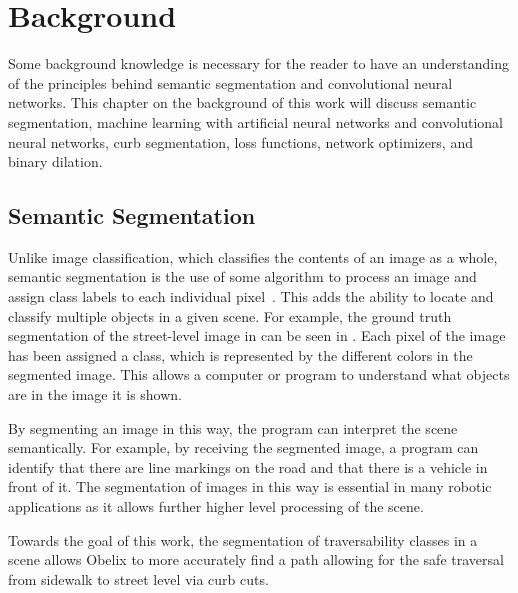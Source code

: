 \chapter{Background}\label{chap:background}
Some background knowledge is necessary for the reader to have an understanding of the principles behind semantic segmentation and convolutional neural networks.
This chapter on the background of this work will discuss semantic segmentation, machine learning with artificial neural networks and convolutional neural networks, curb segmentation, loss functions, network optimizers, and binary dilation.

\section{Semantic Segmentation}\label{section:background-segmentation}
Unlike image classification, which classifies the contents of an image as a whole, semantic segmentation is the use of some algorithm to process an image and assign class labels to each individual pixel~\cite{segmentation-medium}.
This adds the ability to locate and classify multiple objects in a given scene.
For example, the ground truth segmentation of the street-level image in  can be seen in .
Each pixel of the image has been assigned a class, which is represented by the different colors in the segmented image.
This allows a computer or program to understand what objects are in the image it is shown.



By segmenting an image in this way, the program can interpret the scene semantically.
For example, by receiving the segmented image, a program can identify that there are line markings on the road and that there is a vehicle in front of it.
The segmentation of images in this way is essential in many robotic applications as it allows further higher level processing of the scene.

Towards the goal of this work, the segmentation of traversability classes in a scene allows Obelix to more accurately find a path allowing for the safe traversal from sidewalk to street level via curb cuts.



